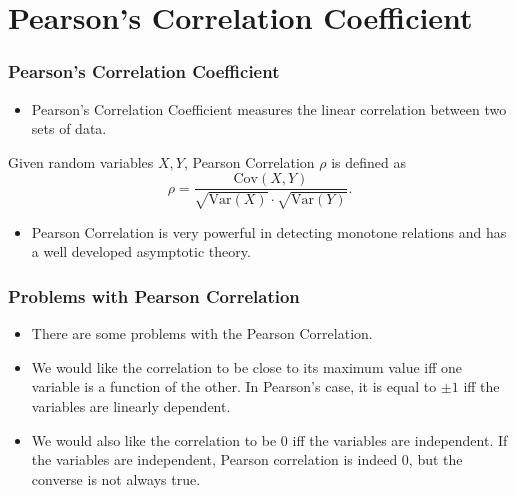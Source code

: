 \documentclass [xcolor=svgnames, t] {beamer}
\begin{document}
\section{Pearson's Correlation Coefficient}
\begin{frame}
    \frametitle{Pearson's Correlation Coefficient}
    \begin{itemize}
        \item Pearson's Correlation Coefficient measures the linear correlation between two sets of data.
    \end{itemize}
    \vspace{2em}
    \begin{definition}
        Given random variables $X, Y$, Pearson Correlation $\rho$ is defined as
        $$\rho = \frac{\text{Cov}(X, Y)}{\sqrt{\text{Var}(X)} \cdot \sqrt{\text{Var}(Y)}}.$$
    \end{definition}
    \vspace{2em}
    \begin{itemize}
        \item Pearson Correlation is very powerful in detecting monotone relations and has a well developed asymptotic theory.
    \end{itemize}
\end{frame}
\begin{frame}
    \frametitle{Problems with Pearson Correlation}
    \begin{itemize}
        \item There are some problems with the Pearson Correlation.
        \vspace{2em}
        \item We would like the correlation to be close to its maximum value iff one variable is a function of the other.
        In Pearson's case, it is equal to $\pm 1$ iff the variables are linearly dependent.
        \vspace{2em}
        \item We would also like the correlation to be 0 iff the variables are independent.
        If the variables are independent, Pearson correlation is indeed 0, but the converse is not always true.
    \end{itemize}
\end{frame}
\end{document}
